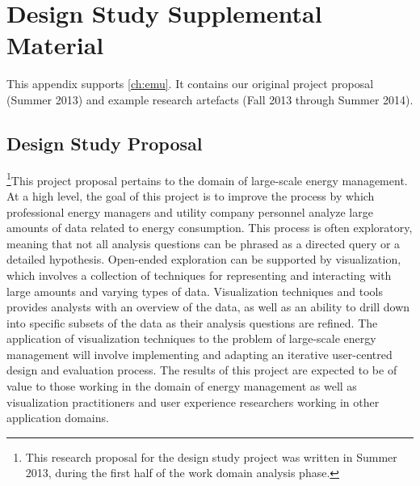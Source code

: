 
\chapter[Appendix: Design Study]{Design Study Supplemental Material}
\label{app:emu}


This appendix supports \autoref{ch:emu}. 
It contains our original project proposal (Summer 2013) and example research artefacts (Fall 2013 through Summer 2014).


\section{Design Study Proposal}
\label{app:emu:proposal}


\footnote{This research proposal for the design study project was written in Summer 2013, during the first half of the work domain analysis phase.}This project proposal pertains to the domain of large-scale energy management. 
At a high level, the goal of this project is to improve the process by which professional energy managers and utility company personnel analyze large amounts of data related to energy consumption. 
This process is often exploratory, meaning that not all analysis questions can be phrased as a directed query or a detailed hypothesis. 
Open-ended exploration can be supported by visualization, which involves a collection of techniques for representing and interacting with large amounts and varying types of data. 
Visualization techniques and tools provides analysts with an overview of the data, as well as an ability to drill down into specific subsets of the data as their analysis questions are refined. 
The application of visualization techniques to the problem of large-scale energy management will involve implementing and adapting an iterative user-centred design and evaluation process. 
The results of this project are expected to be of value to those working in the domain of energy management as well as visualization practitioners and user experience researchers working in other application domains.

